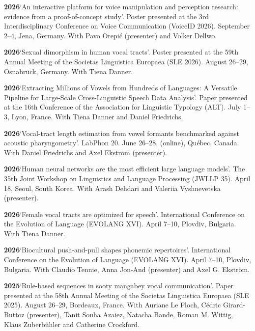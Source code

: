 \documentclass[11pt]{article}
\newcommand{\hangpara}{
 \setlength{\parindent}{0in} %
 \hangindent=0.42in %
}
\begin{document}
\hangpara
\vskip 6pt
{\bf 2026}\hspace{1ex}`An interactive platform for voice manipulation and perception research: evidence from a proof-of-concept study'. Poster presented at the 3rd Interdisciplinary Conference on Voice Communication (VoiceID 2026). September 2--4, Jena, Germany. With Pavo Orepić (presenter) and Volker Dellwo.

\hangpara
\vskip 6pt
{\bf 2026}\hspace{1ex}`Sexual dimorphism in human vocal tracts'. Poster presented at the 59th Annual Meeting of the Societas Linguistica Europaea (SLE 2026). August 26--29, Osnabrück, Germany. With Tiena Danner.

\hangpara
\vskip 6pt
{\bf 2026}\hspace{1ex}`Extracting Millions of Vowels from Hundreds of Languages: A Versatile Pipeline for Large-Scale Cross-Linguistic Speech Data Analysis'. Paper presented at the 16th Conference of the Association for Linguistic Typology (ALT). July 1--3, Lyon, France. With Tiena Danner and Daniel Friedrichs.

\hangpara
\vskip 6pt
{\bf 2026}\hspace{1ex}`Vocal-tract length estimation from vowel formants benchmarked against acoustic pharyngometry'. LabPhon 20. June 26--28, (online), Québec, Canada. With Daniel Friedrichs and Axel Ekström (presenter).

\hangpara
\vskip 6pt
{\bf 2026}\hspace{1ex}`Human neural networks are the most efficient large language models'. The 35th Joint Workshop on Linguistics and Language Processing (JWLLP 35). April 18, Seoul, South Korea. With Arash Dehdari and Valeriia Vyshnevetska (presenter). %

\hangpara
\vskip 6pt
{\bf 2026}\hspace{1ex}`Female vocal tracts are optimized for speech'. International Conference on the Evolution of Language (EVOLANG XVI). April 7--10, Plovdiv, Bulgaria. With Tiena Danner.

\hangpara
\vskip 6pt
{\bf 2026}\hspace{1ex}`Biocultural push-and-pull shapes phonemic repertoires'. International Conference on the Evolution of Language (EVOLANG XVI). April 7--10, Plovdiv, Bulgaria. With Claudio Tennie, Anna Jon-And (presenter) and Axel G. Ekström. 

\hangpara
\vskip 6pt
{\bf 2025}\hspace{1ex}`Rule-based sequences in sooty mangabey vocal communication'. Paper presented at the 58th Annual Meeting of the Societas Linguistica Europaea (SLE 2025). August 26--29, Bordeaux, France. With Auriane Le Floch, Cédric Girard-Buttoz (presenter), Tanit Souha Azaiez, Natacha Bande, Roman M. Wittig, Klaus Zuberbühler and Catherine Crockford. 
\end{document}
